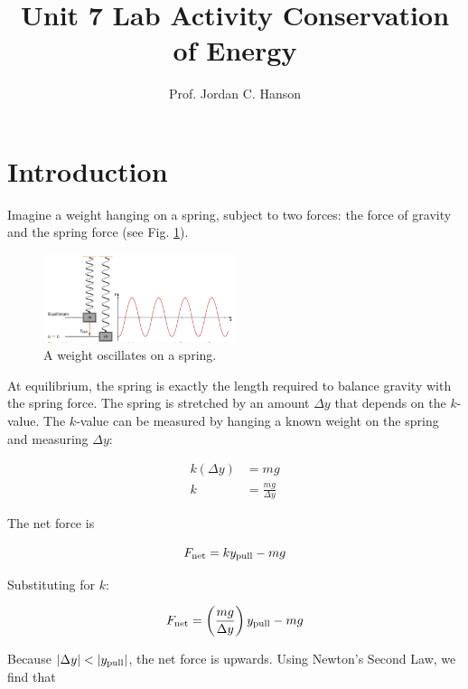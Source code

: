 \documentclass{article}
\begin{document}
\title{Unit 7 Lab Activity Conservation of Energy}
\author{Prof. Jordan C. Hanson}

\maketitle

\section{Introduction}

Imagine a weight hanging on a spring, subject to two forces: the force of gravity and the spring force (see Fig. \ref{fig:spring}).

\begin{figure}[ht]
\centering
\includegraphics[width=0.5\textwidth,trim=0cm 0.2cm 0cm 0.5cm,clip=true]{figures/osc.png}
\caption{\label{fig:spring} A weight oscillates on a spring.}
\end{figure}

At equilibrium, the spring is exactly the length required to balance gravity with the spring force.  The spring is stretched by an amount $\Delta y$ that depends on the $k$-value.  The $k$-value can be measured by hanging a known weight on the spring and measuring $\Delta y$:

\begin{align}
k(\Delta y) &= mg \\
k &= \frac{mg}{\Delta y}
\end{align}

The net force is

\begin{equation}
F_{\rm net} = ky_{\rm pull} - mg
\end{equation}

Substituting for $k$:

\begin{equation}
F_{\rm net} = \left(\frac{mg}{\Delta y}\right) y_{\rm pull} - mg
\end{equation}

Because $|\Delta y| < |y_{\rm pull}|$, the net force is upwards.  Using Newton's Second Law, we find that
\end{document}
